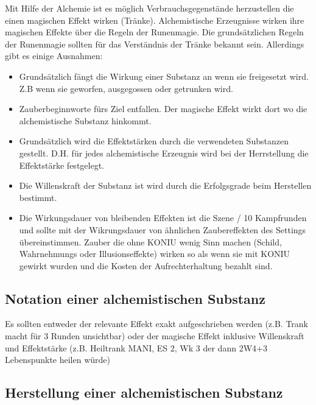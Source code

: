\documentclass{article}
\begin{document}
Mit Hilfe der Alchemie ist es möglich Verbrauchsgegenstände herzustellen die einen magischen Effekt wirken (Tränke).
Alchemistische Erzeugnisse wirken ihre magischen Effekte über die Regeln der Runenmagie. Die grundsätzlichen Regeln
der Runenmagie sollten für das Verständnis der Tränke bekannt sein. Allerdings gibt es einige Ausnahmen:

\begin{itemize}
\item Grundsätzlich fängt die Wirkung einer Substanz an wenn sie freigesetzt wird. Z.B wenn sie geworfen, ausgegossen oder getrunken wird.
\item Zauberbeginnworte fürs Ziel entfallen. Der magische Effekt wirkt dort wo die alchemistische Substanz hinkommt.
\item Grundsätzlich wird die Effektstärken durch die verwendeten Substanzen gestellt. D.H. für jedes alchemistische Erzeugnis wird bei der Herrstellung die Effektstärke festgelegt.
\item Die Willenskraft der Substanz ist wird durch die Erfolgsgrade beim Herstellen bestimmt.
\item Die Wirkungsdauer von bleibenden Effekten ist die Szene / 10 Kampfrunden und sollte mit der Wikrungsdauer von ähnlichen Zaubereffekten des Settings übereinstimmen. Zauber die ohne KONIU wenig Sinn machen (Schild, Wahrnehmungs oder Illusionseffekte) wirken so als wenn sie mit KONIU gewirkt wurden und die Kosten der Aufrechterhaltung bezahlt sind.
\end{itemize}

\begin{center}
\subsection{Notation einer alchemistischen Substanz}
\end{center}

Es sollten entweder der relevante Effekt exakt aufgeschrieben werden (z.B. Trank macht für 3 Runden unsichtbar) oder
der magische Effekt inklusive Willenskraft und Effektstärke (z.B. Heiltrank MANI, ES 2, Wk 3 der dann 2W4+3
Lebenspunkte heilen würde)

\begin{center}
\subsection{Herstellung einer alchemistischen Substanz}
\end{center}
\end{document}
